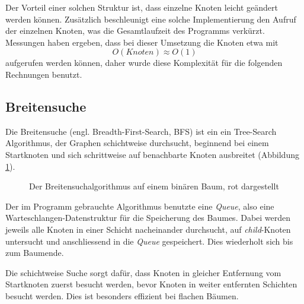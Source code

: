 \documentclass[a4paper,11pt]{article}
\begin{document}


Der Vorteil einer solchen Struktur ist, dass einzelne Knoten leicht geändert werden können. Zusätzlich beschleunigt eine solche Implementierung den Aufruf der einzelnen Knoten, was die Gesamtlaufzeit des Programms verkürzt. Messungen haben ergeben, dass bei dieser Umsetzung die Knoten etwa mit $$O(Knoten) \approx O(1)$$ aufgerufen werden können, daher wurde diese Komplexität für die folgenden Rechnungen benutzt.


\subsection{Breitensuche}

Die Breitensuche (engl. Breadth-First-Search, BFS) ist ein ein Tree-Search Algorithmus, der Graphen schichtweise durchsucht, beginnend bei einem Startknoten und sich schrittweise auf benachbarte Knoten ausbreitet (Abbildung \ref{fig:binary_tree_bfs}).

\begin{figure}[htbp]
\centering
{}
\caption{Der Breitensuchalgorithmus auf einem binären Baum, rot dargestellt}
\label{fig:binary_tree_bfs}
\end{figure}

Der im Programm gebrauchte Algorithmus benutzte eine \emph{Queue}, also eine Warteschlangen-Datenstruktur für die Speicherung des Baumes. Dabei werden jeweils alle Knoten in einer Schicht nacheinander durchsucht, auf \emph{child}-Knoten untersucht und anschliessend in die \emph{Queue} gespeichert. Dies wiederholt sich bis zum Baumende.

Die schichtweise Suche sorgt dafür, dass Knoten in gleicher Entfernung vom Startknoten zuerst besucht werden, bevor Knoten in weiter entfernten Schichten besucht werden. Dies ist besonders effizient bei flachen Bäumen.
\end{document}
